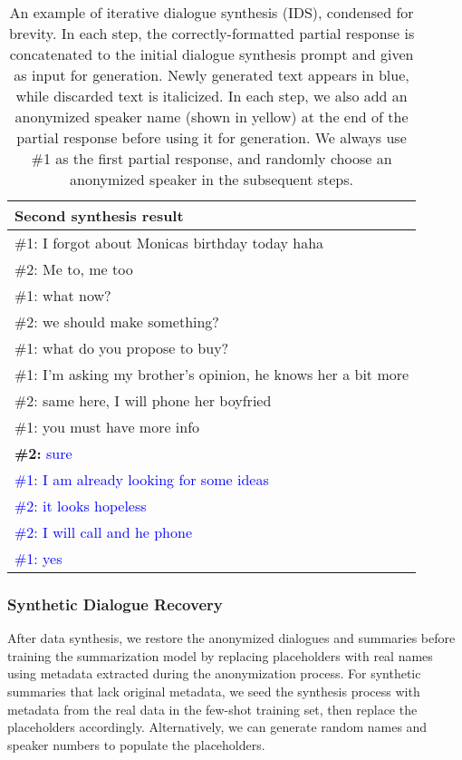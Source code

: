 \begin{table*}[]
\begin{tabular}{l}
\hline
\textbf{Second synthesis result}\\ \hline
\#1: I forgot about Monicas birthday today haha\\
\#2: Me to, me too\\
\#1: what now?\\
\#2: we should make something? \\
\#1: what do you propose to buy?\\
\#1: I'm asking my brother's opinion, he knows her a bit more\\
\#2: same here, I will phone her boyfried\\
\#1: you must have more info\\
\textbf{\#2:} \textcolor{blue}{sure}\\
\textcolor{blue}{\#1: I am already looking for some ideas}\\
\textcolor{blue}{\#2: it looks hopeless}\\
\textcolor{blue}{\#2: I will call and he phone}\\
\textcolor{blue}{\#1: yes }\\
\hline
\end{tabular}
\caption{An example of iterative dialogue synthesis (IDS), condensed for brevity. In each step, the correctly-formatted partial response is concatenated to the initial dialogue synthesis prompt and given as input for generation. Newly generated text appears in blue, while discarded text is italicized. In each step, we also add an anonymized speaker name (shown in yellow) at the end of the partial response before using it for generation. We always use \#1 as the first partial response, and randomly choose an anonymized speaker in the subsequent steps.}
\label{tab:iter}
\end{table*}


\subsubsection{Synthetic Dialogue Recovery}
After data synthesis, we restore the anonymized dialogues and summaries before training the summarization model by replacing placeholders with real names using metadata extracted during the anonymization process. For synthetic summaries that lack original metadata, we seed the synthesis process with metadata from the real data in the few-shot training set, then replace the placeholders accordingly. Alternatively, we can generate random names and speaker numbers to populate the placeholders.


